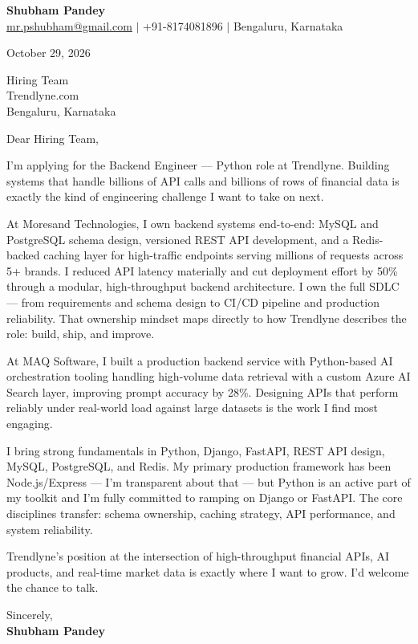 \documentclass[a4paper,11pt]{article}
\begin{document}
\begin{center}
{\LARGE \textbf{Shubham Pandey}}\\[4pt]
\href{mailto:mr.pshubham@gmail.com}{mr.pshubham@gmail.com} \quad $|$ \quad +91-8174081896 \quad $|$ \quad Bengaluru, Karnataka
\end{center}

\vspace{8pt}

October 29, 2026

\vspace{8pt}

Hiring Team\\
Trendlyne.com\\
Bengaluru, Karnataka

\vspace{12pt}

Dear Hiring Team,

\vspace{6pt}

I'm applying for the Backend Engineer --- Python role at Trendlyne. Building systems that handle billions of API calls and billions of rows of financial data is exactly the kind of engineering challenge I want to take on next.

\vspace{6pt}

At Moresand Technologies, I own backend systems end-to-end: MySQL and PostgreSQL schema design, versioned REST API development, and a Redis-backed caching layer for high-traffic endpoints serving millions of requests across 5+ brands. I reduced API latency materially and cut deployment effort by 50\% through a modular, high-throughput backend architecture. I own the full SDLC --- from requirements and schema design to CI/CD pipeline and production reliability. That ownership mindset maps directly to how Trendlyne describes the role: build, ship, and improve.

\vspace{6pt}

At MAQ Software, I built a production backend service with Python-based AI orchestration tooling handling high-volume data retrieval with a custom Azure AI Search layer, improving prompt accuracy by 28\%. Designing APIs that perform reliably under real-world load against large datasets is the work I find most engaging.

\vspace{6pt}

I bring strong fundamentals in Python, Django, FastAPI, REST API design, MySQL, PostgreSQL, and Redis. My primary production framework has been Node.js/Express --- I'm transparent about that --- but Python is an active part of my toolkit and I'm fully committed to ramping on Django or FastAPI. The core disciplines transfer: schema ownership, caching strategy, API performance, and system reliability.

\vspace{6pt}

Trendlyne's position at the intersection of high-throughput financial APIs, AI products, and real-time market data is exactly where I want to grow. I'd welcome the chance to talk.

\vspace{16pt}

Sincerely,\\[4pt]
\textbf{Shubham Pandey}
\end{document}
